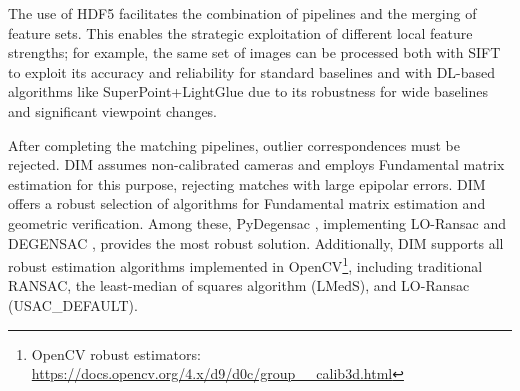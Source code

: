 The use of HDF5 facilitates the combination of pipelines and the merging of feature sets. 
This enables the strategic exploitation of different local feature strengths; for example, the same set of images can be processed both with SIFT to exploit its accuracy and reliability for standard baselines and with DL-based algorithms like SuperPoint+LightGlue due to its robustness for wide baselines and significant viewpoint changes.

After completing the matching pipelines, outlier correspondences must be rejected. 
DIM assumes non-calibrated cameras and employs Fundamental matrix estimation for this purpose, rejecting matches with large epipolar errors. 
DIM offers a robust selection of algorithms for Fundamental matrix estimation and geometric verification. 
Among these, PyDegensac \cite{Mishkin2015_pydegensac}, implementing LO-Ransac \cite{Chum2003_loransac} and DEGENSAC \cite{Chum2005_degensac}, provides the most robust solution.  Additionally, DIM supports all robust estimation algorithms implemented in OpenCV\footnote{OpenCV robust estimators: \url{https://docs.opencv.org/4.x/d9/d0c/group__calib3d.html}}, including traditional RANSAC, the least-median of squares algorithm (LMedS), and LO-Ransac (USAC\_DEFAULT).




